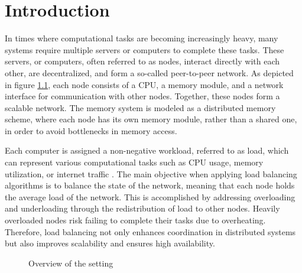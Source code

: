 \chapter{Introduction}\label{chap:introduction}
In times where computational tasks are becoming increasingly heavy, many systems require multiple servers or computers to complete these tasks. These servers, or computers, often referred to as nodes, interact directly with each other, are decentralized, and form a so-called peer-to-peer network. As depicted in figure \ref{fig:setting}, each node consists of a CPU, a memory module, and a network interface for communication with other nodes. Together, these nodes form a scalable network. The memory system is modeled as a distributed memory scheme, where each node has its own memory module, rather than a shared one, in order to avoid bottlenecks in memory access. \cite{ChengzhongFrancis}

Each computer is assigned a non-negative workload, referred to as load, which can represent various computational tasks such as CPU usage, memory utilization, or internet traffic \cite{Dinitz2023DAB}. The main objective when applying load balancing algorithms is to balance the state of the network, meaning that each node holds the average load of the network. This is accomplished by addressing overloading and underloading through the redistribution of load to other nodes. Heavily overloaded nodes risk failing to complete their tasks due to overheating. Therefore, load balancing not only enhances coordination in distributed systems but also improves scalability and ensures high availability.

\begin{figure}[]
    \centering
    \caption{Overview of the setting}
    \label{fig:setting}
\end{figure}

